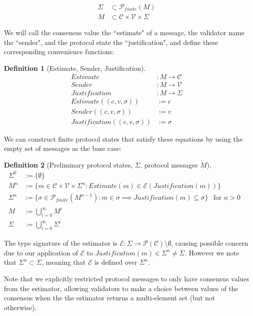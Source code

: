 \documentclass{article}
\theoremstyle{definition}
\newtheorem{defn}{Definition}[section]
\begin{document}
\begin{align}
\Sigma &\subset \mathcal{P}_{finite}(M) \\
M &\subset \mathcal{C} \times \mathcal{V} \times \Sigma
\end{align}

We will call the consensus value the ``estimate" of a message, the validator name the ``sender", and the protocol state the ``justification", and define these corresponding convenience functions:

\begin{defn}[Estimate, Sender, Justification]
\begin{align}
Estimate&:M \to \mathcal{C} \\
Sender&:M \to \mathcal{V} \\
Justification&:M \to \Sigma \\
Estimate((c, v, \sigma)) &:= c \\
Sender((c, v, \sigma)) &:= v \\
Justification((c, v, \sigma)) &:= \sigma
\end{align}
\end{defn}

We can construct finite protocol states that satisfy these equations by using the empty set of messages as the base case:

\begin{defn}[Preliminary protocol states, $\Sigma$, protocol messages $M$]
\begin{align}
  \Sigma^0& := \{\emptyset\} \\
  M^n& := \{ m \in \mathcal{C} \times \mathcal{V} \times \Sigma^n: Estimate(m) \in \mathcal{E}(Justification(m))\}\\
  \Sigma^n& := \{ \sigma \in \mathcal{P}_{finite}(M^{n-1}) : m \in \sigma \implies Justification(m) \subseteq \sigma \} ~ ~ \text{ for $n > 0$ } \\
  M& := \bigcup_{i = 0}^{\infty} M^i \\
  \Sigma& := \bigcup_{i = 0}^{\infty} \Sigma^i
\end{align}
\end{defn}

The type signature of the estimator is $\mathcal{E} : \Sigma \to \mathcal{P}(\mathcal{C}) \setminus \emptyset$, causing possible concern due to our application of $\mathcal{E}$ to $Justification(m) \in \Sigma^n \neq \Sigma$. However we note that $\Sigma^n \subset \Sigma$, meaning that $\mathcal{E}$ is defined over $\Sigma^n$.

Note that we explicitly restricted protocol messages to only have consensus values from the estimator, allowing validators to make a choice between values of the consensus when the the estimator returns a multi-element set (but not otherwise).
\end{document}
